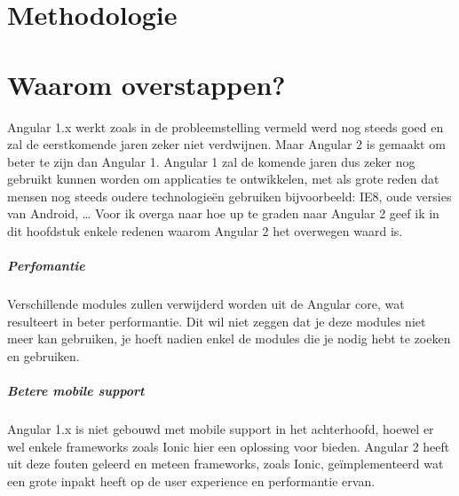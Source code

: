 \documentclass[pdftex,a4paper,12pt,twoside]{report}
\begin{document}
\chapter{Methodologie}
\label{ch:methodologie}


\chapter{Waarom overstappen?}
\label{ch:waarom}

Angular 1.x werkt zoals in de probleemstelling vermeld werd nog steeds goed en zal de eerstkomende jaren zeker niet verdwijnen. Maar Angular 2 is gemaakt om beter te zijn dan Angular 1. Angular 1 zal de komende jaren dus zeker nog gebruikt kunnen worden om applicaties te ontwikkelen, met als grote reden dat mensen nog steeds oudere technologie\"en gebruiken bijvoorbeeld: IE8, oude versies van Android, \ldots
\newline
\newline
Voor ik overga naar hoe up te graden naar Angular 2 geef ik in dit hoofdstuk enkele redenen waarom Angular 2 het overwegen waard is. 

\paragraph{Perfomantie} 
Verschillende modules zullen verwijderd worden uit de Angular core, wat resulteert in beter performantie. Dit wil niet zeggen dat je deze modules niet meer kan gebruiken, je hoeft nadien enkel de modules die je nodig hebt te zoeken en gebruiken.
\par

\paragraph{Betere mobile support}
Angular 1.x is niet gebouwd met mobile support in het achterhoofd, hoewel er wel enkele frameworks zoals Ionic hier een oplossing voor bieden. Angular 2 heeft uit deze fouten geleerd en meteen frameworks, zoals Ionic, ge\"implementeerd wat een grote inpakt heeft op de user experience en performantie ervan. 
\par
\end{document}
